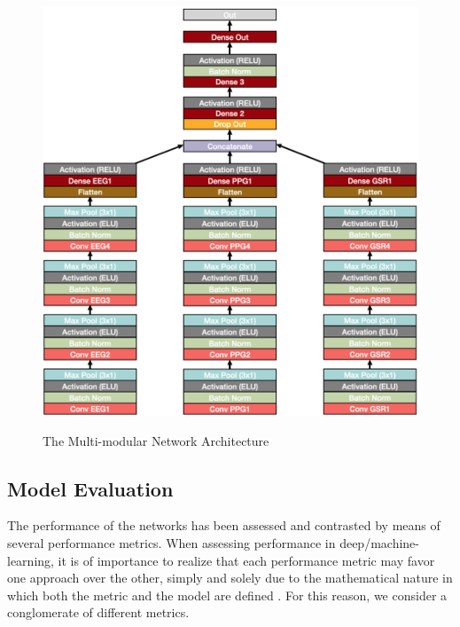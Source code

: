 \documentclass[12pt]{article}
\begin{document}
\begin{figure}
\caption{The Multi-modular Network Architecture}
\bigskip
\includegraphics[scale=0.7]{multi_model_architecture}
\label{fig:multiarchitecture}
\end{figure}
\restoregeometry

\newpage
\subsection{Model Evaluation}
The performance of the networks has been assessed and contrasted by means of several performance metrics. When assessing performance in deep/machine-learning, it is of importance to realize that each performance metric may favor one approach over the other, simply and solely due to the mathematical nature in which both the metric and the model are defined \cite{gunawardana2009survey}. For this reason, we consider a conglomerate of different metrics. 
\end{document}
